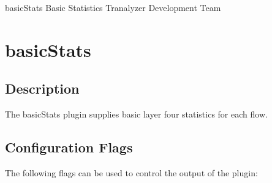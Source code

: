 \documentclass[documentation]{subfiles}
\begin{document}
\trantitle
    {basicStats}
    {Basic Statistics}
    {Tranalyzer Development Team} %

\section{basicStats}\label{s:basicStats}

\subsection{Description}
The basicStats plugin supplies basic layer four statistics for each flow.

\subsection{Configuration Flags}
The following flags can be used to control the output of the plugin:
\end{document}
